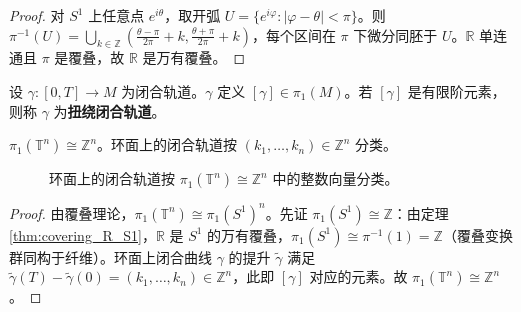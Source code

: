 \begin{proof}
对 $S^1$ 上任意点 $e^{i\theta}$，取开弧 $U = \{e^{i\varphi} : |\varphi - \theta| < \pi\}$。则 $\pi^{-1}(U) = \bigcup_{k \in \mathbb{Z}} (\frac{\theta - \pi}{2\pi} + k, \frac{\theta + \pi}{2\pi} + k)$，每个区间在 $\pi$ 下微分同胚于 $U$。$\mathbb{R}$ 单连通且 $\pi$ 是覆叠，故 $\mathbb{R}$ 是万有覆叠。
\end{proof}

\begin{definition}[闭合轨道与基本群]\label{def:closed_orbit_manifold}
设 $\gamma: [0,T] \to M$ 为闭合轨道。$\gamma$ 定义 $[\gamma] \in \pi_1(M)$。若 $[\gamma]$ 是有限阶元素，则称 $\gamma$ 为\textbf{扭绕闭合轨道}。
\end{definition}

\begin{proposition}[环面的基本群]\label{prop:periodic_manifold_fundamental_group}
$\pi_1(\mathbb{T}^n) \cong \mathbb{Z}^n$。环面上的闭合轨道按 $(k_1, \dots, k_n) \in \mathbb{Z}^n$ 分类。
\end{proposition}

\begin{figure}[htbp]
\centering
{}
\caption{环面上的闭合轨道按 $\pi_1(\mathbb{T}^n)\cong\mathbb{Z}^n$ 中的整数向量分类。}
\label{fig:torus_fundamental_group}
\end{figure}

\begin{proof}
由覆叠理论，$\pi_1(\mathbb{T}^n) \cong \pi_1(S^1)^n$。先证 $\pi_1(S^1) \cong \mathbb{Z}$：由定理 \ref{thm:covering_R_S1}，$\mathbb{R}$ 是 $S^1$ 的万有覆叠，$\pi_1(S^1) \cong \pi^{-1}(1) = \mathbb{Z}$（覆叠变换群同构于纤维）。环面上闭合曲线 $\gamma$ 的提升 $\tilde{\gamma}$ 满足 $\tilde{\gamma}(T) - \tilde{\gamma}(0) = (k_1, \dots, k_n) \in \mathbb{Z}^n$，此即 $[\gamma]$ 对应的元素。故 $\pi_1(\mathbb{T}^n) \cong \mathbb{Z}^n$。
\end{proof}

